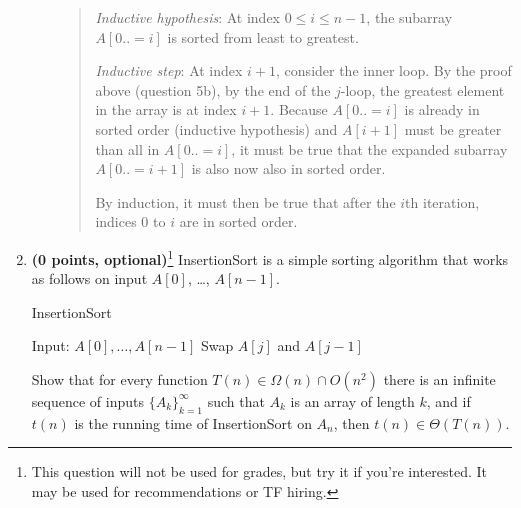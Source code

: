 \documentclass[11pt]{article}
\begin{document}
\begin{enumerate}[leftmargin=*]
\begin{enumerate}
\begin{quote}
        \medskip
        \textit{Inductive hypothesis}: At index $0 \leq i \leq n - 1$, the subarray $A[0..=i]$ is sorted from least to greatest.

        \medskip 
        \textit{Inductive step}: At index $i + 1$, consider the inner loop. By the proof above (question 5b), by the end of the $j$-loop, the greatest element in the array is at index $i + 1$. Because $A[0..=i]$ is already in sorted order (inductive hypothesis) and $A[i + 1]$ must be greater than all in $A[0..=i]$,  it must be true that the expanded subarray $A[0..=i + 1]$ is also now also in sorted order.

        \medskip
        By induction, it must then be true that after the $i$th iteration, indices $0$ to $i$ are in sorted order.
      \end{quote}
\end{enumerate}
    

\item
{\bf (0 points, optional)}\footnote{This question will not be used for grades, but try it if you're interested.
It may be used for recommendations or TF hiring.}
InsertionSort is a simple sorting algorithm that works as follows on input $A[0]$, \ldots, $A[n-1]$.
\begin{algorithm}
\caption{InsertionSort}
\begin{algorithmic}
\STATE Input: $A[0], \dots, A[n-1]$
                \STATE Swap $A[j]$ and $A[j - 1]$
        \ENDWHILE
\ENDFOR
\end{algorithmic}
\end{algorithm}

Show that for every function $T(n) \in \Omega(n) \cap O(n^2)$
there is an infinite sequence of inputs $\{A_k\}_{k=1}^{\infty}$
such that $A_k$ is an array of length $k$, and if $t(n)$ is the running time of
InsertionSort on $A_n$, then $t(n) \in \Theta(T(n))$.


\end{enumerate}
\end{document}
